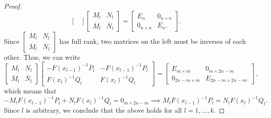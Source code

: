 \documentclass[11pt,reqno,oneside,a4paper]{article}
\theoremstyle{plain} %
\theoremstyle{definition}
\theoremstyle{remark}
\begin{document}
\begin{proof}
\[\begin{bmatrix}
\end{bmatrix}
\begin{bmatrix}
M_l & N_l \\
\overline{M}_l & \overline{N}_l
\end{bmatrix} = 
\begin{bmatrix}
E_n & 0_{n\times n} \\
0_{n\times n} & E_n.
\end{bmatrix}.
\]
Since $\begin{bmatrix}
M_l & N_l \\
\overline{M}_l & \overline{N}_l
\end{bmatrix}$ has full rank, two matrices on the left must be inverses of each other. Thus, we can write
\[ 
\begin{bmatrix}
M_l & N_l \\
\overline{M}_l & \overline{N}_l
\end{bmatrix} 
\begin{bmatrix}
- F(x_{l-1})^{-1} \overline{P}_l & - F(x_{l-1})^{-1} P_l \\
F(x_l)^{-1}\overline{Q}_l & F(x_l)^{-1}Q_l
\end{bmatrix}
= 
\begin{bmatrix}
E_{m\times m} & 0_{m\times 2n-m} \\
0_{2n-m\times m} & E_{2n-m\times 2n-m} .
\end{bmatrix},
\] 
which means that 
\[ 
-  M_l  F(x_{l-1})^{-1} P_l + N_l F(x_l)^{-1}Q_l   =  0_{m\times 2n-m} \implies M_l  F(x_{l-1})^{-1} P_l = N_l F(x_l)^{-1}Q_l.
\]
Since $l$ is arbitrary, we conclude that the above holds for all $l = 1, \ldots, k.$


\end{proof}
\end{document}
